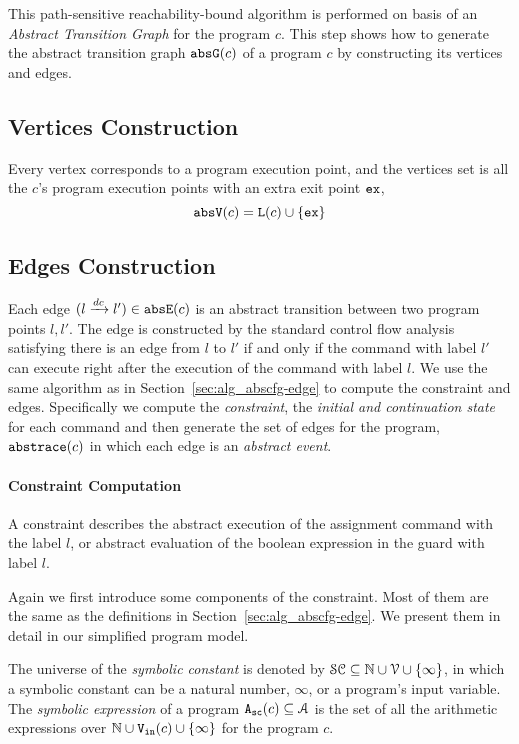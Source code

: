 This path-sensitive reachability-bound algorithm
is performed on basis of an \emph{Abstract Transition Graph} for the program $c$.
This step shows how to generate the abstract transition graph $\mathtt{abs}{\mathtt{G}}(c)$ of a
program $c$ by constructing its vertices and edges.

\subsection{Vertices Construction}
\label{sec:abs_prog-vertex}
Every 
vertex corresponds to a program execution point, 
and the vertices set is all the $c$'s program execution points with an extra exit point ${\mathtt{ex}}$, 
\[ 
 \mathtt{abs}{\mathtt{V}}(c) = \mathtt{L}(c)\cup\{{\mathtt{ex}}\}
 \]

\subsection{Edges Construction}
\label{sec:abs_prog-edge}
Each edge $(l \xrightarrow{dc} l') \in \mathtt{abs}{\mathtt{E}}(c)$ is an abstract transition
between two program points $l, l'$. 
The edge is constructed by the standard control flow analysis satisfying
there is an edge from $l$ to $l'$ if and only if
the command with label $l'$ can execute right after the execution of the command with label $l$.
We use the same algorithm as in Section~\ref{sec:alg_abscfg-edge} to compute the constraint and edges.
Specifically we compute the \emph{constraint}, the \emph{initial and continuation state} for each command
and then generate the set of edges for the program, $\mathtt{abs}{\mathtt{trace}}(c)$ in which each edge is an
\emph{abstract event}.
\paragraph{Constraint Computation}
A constraint describes the abstract execution of the assignment command with the label $l$,
or abstract evaluation of the boolean expression in the guard with label $l$.

Again we first introduce some components of the constraint. Most of them are the same as the definitions in Section~\ref{sec:alg_abscfg-edge}. We present them in detail in our simplified program model.

\begin{defn}
 \label{def:symbolic_expr}
The universe of the \emph{symbolic constant} is denoted by $\mathcal{SC} \subseteq \mathbb{N} \cup \mathcal{V} \cup \{\infty \}$, in which a symbolic constant can be a natural number, $\infty$, or a program's input variable.
 The \emph{symbolic expression} of a program ${\mathtt{A_{sc}}}(c) \subseteq \mathcal{A}$ is the set of all the arithmetic expressions over $\mathbb{N} \cup {\ensuremath{\mathtt{V_{\mathtt{in}}}}}(c) \cup \{\infty \}$ for the program $c$.
\end{defn}

